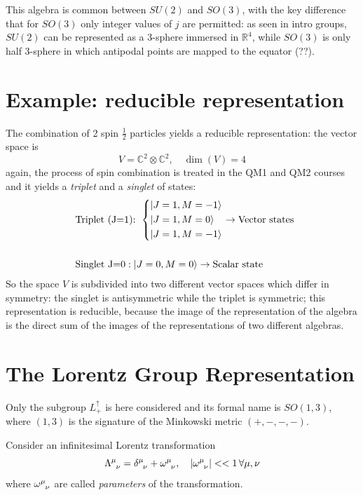 This algebra is common between $SU(2)$ and $SO(3)$, with the key difference that
for $SO(3)$ only integer values of $j$ are permitted: as seen in intro groups, $SU(2)$
can be represented as a 3-sphere immersed in $\mathbb{R}^4$, while $SO(3)$ is
only half 3-sphere in which antipodal points are mapped to the equator (??).

\section{Example: reducible representation}
The combination of 2 spin $\frac{1}{2}$ particles yields a reducible representation:
the vector space is
$$V = \mathbb{C}^2\otimes\mathbb{C}^2,\quad \dim(V)=4$$
again, the process of spin combination is treated in the QM1 and QM2 courses and it
yields a \textit{triplet} and a \textit{singlet} of states:
\begin{align*}
&\text{Triplet (J=1): }\begin{dcases*}
\ket{J=1,M=-1}\\
\ket{J=1, M=0}\\
\ket{J=1, M=-1}
\end{dcases*}\rightarrow\text{Vector states}\\
\phantom{x}\\
&\text{Singlet J=0}: \ket{J=0,M=0} \rightarrow\text{Scalar state}
\end{align*}
So the space $V$ is subdivided into two different vector spaces which differ in
symmetry: the singlet is antisymmetric while the triplet is symmetric; this
representation is reducible, because the image of the representation of the algebra
is the direct sum of the images of the representations of two different algebras.
\section{The Lorentz Group Representation}
Only the subgroup $L^\uparrow_+$ is here considered and its formal name is
$SO(1,3)$, where $(1,3)$ is the signature of the Minkowski metric $(+,-,-,-)$.

Consider an infinitesimal Lorentz transformation
$$\Lambda\indices{^\mu_\nu} = \delta\indices{^\mu_\nu}+\omega\indices{^\mu_\nu},\quad
|\omega\indices{^\mu_\nu}|<<1\,\forall\mu,\nu
$$
where $\omega\indices{^\mu_\nu}$ are called \textit{parameters} of the transformation.

